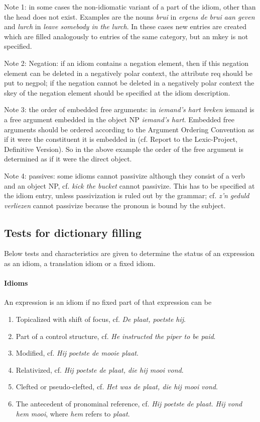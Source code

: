 Note 1: in some cases the non-idiomatic variant of a part of the idiom, other
than the head does not exist. Examples are the nouns {\em brui} in {\em ergens
de brui aan geven} and {\em lurch} in {\em leave somebody in the lurch}. In
these cases new entries are created which are filled analogously to entries of
the same category, but an mkey is not specified. 

Note 2: Negation: if an idiom contains a negation element, then if this 
negation element can be deleted in a negatively polar context, the attribute 
req should be put to negpol; if the negation cannot be deleted in a negatively 
polar context the skey of the negation element should be specified at the idiom
description.

Note 3: the order of embedded free arguments: in {\em iemand's hart breken}
iemand is a free argument embedded in the object NP {\em iemand's hart}. 
Embedded free arguments should be ordered according to the Argument Ordering 
Convention as if it were the constituent it is embedded in (cf. Report to the 
Lexic-Project, Definitive Version). So in the above example the order of the
free argument is determined as if it were the direct object. 

Note 4: passives: some idioms cannot passivize although they consist of a verb 
and an object NP, cf. {\em kick the bucket} cannot passivize. This has to be
specified at the idiom entry, unless passivization is ruled out by the grammar;
cf. {\em z'n geduld verliezen} cannot passivize because the pronoun is bound by
the subject. 

\subsection{Tests for dictionary filling}
\label{tfdf}

Below tests and characteristics are given to determine the status of an 
expression as an idiom, a translation idiom or a fixed idiom.

\paragraph{Idioms}
An expression is an idiom if no fixed part of that expression can be 
\begin{enumerate}
  \item Topicalized with shift of focus, cf. {\em De plaat, poetste hij}.
  \item Part of a control structure, cf. {\em He instructed the piper to be
paid}.
  \item Modified, cf. {\em Hij poetste de mooie plaat}.
  \item Relativized, cf. {\em Hij poetste de plaat, die hij mooi vond}.
  \item Clefted or pseudo-clefted, cf. {\em Het was de plaat, die hij mooi
vond}.
  \item The antecedent of pronominal reference, cf. {\em Hij poetste de plaat.
Hij vond hem mooi}, where {\em hem} refers to {\em plaat}. 
\end{enumerate}

